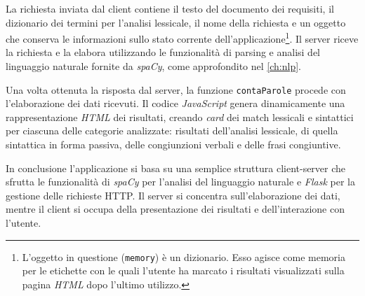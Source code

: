 \documentclass[12pt]{report}
\newcommand{\javascript}{\textsl{JavaScript}\xspace}
\newcommand{\flask}{\textsl{Flask}\xspace}
\newcommand{\spacy}{\textsl{spaCy}\xspace}
\newcommand{\html}{\textsl{HTML}\xspace}
\newcommand{\http}{\textsf{HTTP}\xspace}
\begin{document}
La richiesta inviata dal client contiene il testo del documento dei requisiti, il dizionario dei termini per l'analisi lessicale, il nome della richiesta e un oggetto che conserva le informazioni sullo stato corrente dell'applicazione\footnote{L'oggetto in questione (\texttt{memory}) è un dizionario. Esso agisce come memoria per le etichette con le quali l'utente ha marcato i risultati visualizzati sulla pagina \html dopo l'ultimo utilizzo.}. Il server riceve la richiesta e la elabora utilizzando le funzionalità di parsing e analisi del linguaggio naturale fornite da \spacy, come approfondito nel \cref{ch:nlp}.

Una volta ottenuta la risposta dal server, la funzione \texttt{contaParole} procede con l'elaborazione dei dati ricevuti. Il codice \javascript genera dinamicamente una rappresentazione \html dei risultati, creando \textit{card} dei match lessicali e sintattici per ciascuna delle categorie analizzate: risultati dell'analisi lessicale, di quella sintattica in forma passiva, delle congiunzioni verbali e delle frasi congiuntive.

In conclusione l'applicazione si basa su una semplice struttura client-server che sfrutta le funzionalità di \spacy per l'analisi del linguaggio naturale e \flask per la gestione delle richieste \http. Il server si concentra sull'elaborazione dei dati, mentre il client si occupa della presentazione dei risultati e dell'interazione con l'utente.
\end{document}
